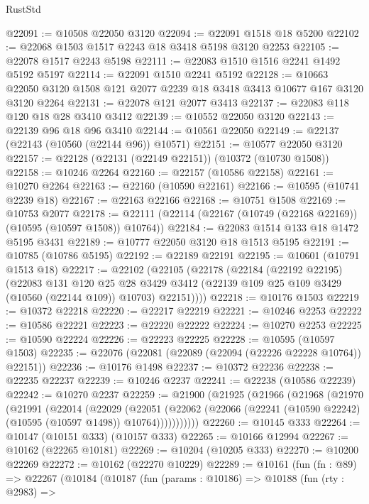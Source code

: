 \begin{lexlean}{RustStd}
\begin{coremodule}
@22091 := @10508 @22050 @3120
@22094 := @22091 @1518 @18 @5200
@22102 := @22068 @1503 @1517 @2243 @18 @3418 @5198 @3120 @2253
@22105 := @22078 @1517 @2243 @5198
@22111 := @22083 @1510 @1516 @2241 @1492 @5192 @5197
@22114 := @22091 @1510 @2241 @5192
@22128 := @10663 @22050 @3120 @1508 @121 @2077 @2239 @18 @3418 @3413 @10677 @167 @3120 @3120 @2264
@22131 := @22078 @121 @2077 @3413
@22137 := @22083 @118 @120 @18 @28 @3410 @3412
@22139 := @10552 @22050 @3120
@22143 := @22139 @96 @18 @96 @3410
@22144 := @10561 @22050
@22149 := @22137 (@22143 (@10560 (@22144 @96)) @10571)
@22151 := @10577 @22050 @3120
@22157 := @22128 (@22131 (@22149 @22151)) (@10372 (@10730 @1508))
@22158 := @10246 @2264
@22160 := @22157 (@10586 @22158)
@22161 := @10270 @2264
@22163 := @22160 (@10590 @22161)
@22166 := @10595 (@10741 @2239 @18)
@22167 := @22163 @22166
@22168 := @10751 @1508
@22169 := @10753 @2077
@22178 := @22111 (@22114 (@22167 (@10749 (@22168 @22169)) (@10595 (@10597 @1508)) @10764))
@22184 := @22083 @1514 @133 @18 @1472 @5195 @3431
@22189 := @10777 @22050 @3120 @18 @1513 @5195
@22191 := @10785 (@10786 @5195)
@22192 := @22189 @22191
@22195 := @10601 (@10791 @1513 @18)
@22217 := @22102
    (@22105
      (@22178
        (@22184
          (@22192 @22195)
          (@22083
            @131
            @120
            @25
            @28
            @3429
            @3412
            (@22139 @109 @25 @109 @3429 (@10560 (@22144 @109)) @10703)
            @22151))))
@22218 := @10176 @1503
@22219 := @10372 @22218
@22220 := @22217 @22219
@22221 := @10246 @2253
@22222 := @10586 @22221
@22223 := @22220 @22222
@22224 := @10270 @2253
@22225 := @10590 @22224
@22226 := @22223 @22225
@22228 := @10595 (@10597 @1503)
@22235 := @22076 (@22081 (@22089 (@22094 (@22226 @22228 @10764)) @22151))
@22236 := @10176 @1498
@22237 := @10372 @22236
@22238 := @22235 @22237
@22239 := @10246 @2237
@22241 := @22238 (@10586 @22239)
@22242 := @10270 @2237
@22259 := @21900
    (@21925
      (@21966
        (@21968
          (@21970
            (@21991
              (@22014
                (@22029
                  (@22051
                    (@22062
                      (@22066 (@22241 (@10590 @22242) (@10595 (@10597 @1498)) @10764)))))))))))
@22260 := @10145 @333
@22264 := @10147 (@10151 @333) (@10157 @333)
@22265 := @10166 @12994
@22267 := @10162 (@22265 @10181)
@22269 := @10204 (@10205 @333)
@22270 := @10200 @22269
@22272 := @10162 (@22270 @10229)
@22289 := @10161
    (fun (fn : @89) =>
    @22267
      (@10184
        (@10187
          (fun (params : @10186) =>
          @10188
            (fun (rty : @2983) =>

\end{coremodule}
\end{lexlean}
